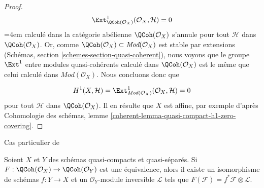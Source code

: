 \begin{proof}
$$
\Ext^1_{\QCoh(\mathcal{O}_X)}(\mathcal{O}_X, \mathcal{H}) = 0
$$
\begingroup\emergencystretch=4em
calculé dans la catégorie abélienne $\QCoh(\mathcal{O}_X)$ s'annule pour
tout $\mathcal{H}$ dans $\QCoh(\mathcal{O}_X)$. Or, comme
$\QCoh(\mathcal{O}_X) \subset \textit{Mod}(\mathcal{O}_X)$
est stable par extensions (Schémas, section
\ref{schemes-section-quasi-coherent}), nous voyons que le groupe $\Ext^1$
entre modules quasi-cohérents calculé dans $\QCoh(\mathcal{O}_X)$ est le même
que celui calculé dans $\textit{Mod}(\mathcal{O}_X)$. Nous concluons donc que\par\endgroup
$$
H^1(X, \mathcal{H}) =
\Ext^1_{\textit{Mod}(\mathcal{O}_X)}(\mathcal{O}_X, \mathcal{H}) = 0
$$
pour tout $\mathcal{H}$ dans $\QCoh(\mathcal{O}_X)$.
Il en résulte que $X$ est affine, par exemple d'après
Cohomologie des schémas, lemme
\ref{coherent-lemma-quasi-compact-h1-zero-covering}.
\end{proof}

\begin{proposition}
\label{proposition-gabriel-rosenberg}
\begin{reference}
Cas particulier de \cite[Theorem 1.2]{Brandenburg}
\end{reference}
Soient $X$ et $Y$ des schémas quasi-compacts et quasi-séparés.
Si $F : \QCoh(\mathcal{O}_X) \to \QCoh(\mathcal{O}_Y)$
est une équivalence, alors il existe un isomorphisme de schémas
$f : Y \to X$ et un $\mathcal{O}_Y$-module inversible
$\mathcal{L}$ tels que $F(\mathcal{F}) = f^*\mathcal{F} \otimes \mathcal{L}$.
\end{proposition}

